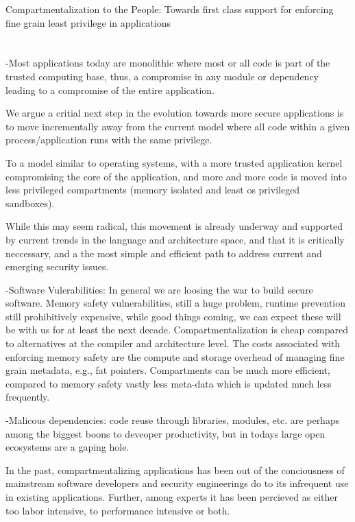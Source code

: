Compartmentalization to the People: Towards first class support for enforcing
fine grain least privilege in applications

\section{}

-Most applications today are monolithic where most or all code is part of the
trusted computing base, thus, a compromise in any module or dependency leading
to a compromise of the entire application.

We argue a critial next step in the evolution towards more secure applications
is to move incrementally away from the current model where all code within a
given process/application runs with the same privilege.

To a model similar to operating systems, with a more trusted application kernel
compromising the core of the application, and more and more code is moved into
less privileged compartments (memory isolated and least os privileged
sandboxes).

While this may seem radical, this movement is already underway and supported by
current trends in the language and architecture space, and that it is critically
neccessary, and a the most simple and efficient path to address current
and emerging security issues.

-Software Vulerabilities: In general we are loosing the war to build secure
    software.  Memory safety vulnerabilities, still a huge problem, runtime
    prevention still prohibitively expensive, while good things coming, we can
    expect these will be with us for at least the next decade. Compartmentalization
    is cheap compared to alternatives at the compiler and architecture level. The
    costs associated with enforcing memory safety are the compute and storage overhead
    of managing fine grain metadata, e.g., fat pointers. Compartments can be
    much more efficient, compared to memory safety vastly less meta-data which
    is updated much less frequently.

    -Malicous dependencies: code reuse through libraries, modules, etc. are
    perhaps among the biggest boons to deveoper productivity, but in todays
    large open ecosystems are a gaping hole. 

In the past, compartmentalizing applications has been out of the conciousness
of mainstream software developers and security engineerings do to its
infrequent use in existing applications. Further, among experts it has been
percieved as either too labor intensive, to performance intensive or both.

